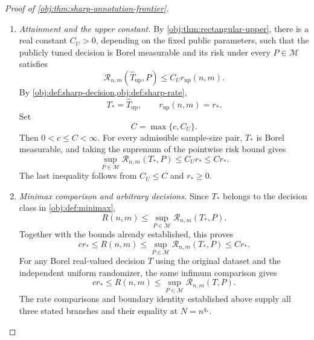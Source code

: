 \begin{proof}[Proof of \cref{obj:thm:sharp-annotation-frontier}]
\begin{enumerate}
\item \emph{Attainment and the upper constant.}
By \cref{obj:thm:rectangular-upper}, there is a real constant \(C_U>0\), depending on the fixed public parameters, such that the publicly tuned decision is Borel measurable and its risk under every \(P\in\mathcal M\) satisfies
\[
\mathcal R_{n,m}(\widehat T_{\mathrm{up}},P)
\le C_U r_{\mathrm{up}}(n,m).
\]
By \cref{obj:def:sharp-decision,obj:def:sharp-rate},
\[
T_*=\widehat T_{\mathrm{up}},
\qquad
r_{\mathrm{up}}(n,m)=r_*.
\]
Set
\[
C=\max\{c,C_U\}.
\]
Then \(0<c\le C<\infty\). For every admissible sample-size pair, \(T_*\) is Borel measurable, and taking the supremum of the pointwise risk bound gives
\[
\sup_{P\in\mathcal M}\mathcal R_{n,m}(T_*,P)
\le C_U r_*
\le C r_*.
\]
The last inequality follows from \(C_U\le C\) and \(r_*\ge0\).

\item \emph{Minimax comparison and arbitrary decisions.}
Since \(T_*\) belongs to the decision class in \cref{obj:def:minimax},
\[
R(n,m)\le
\sup_{P\in\mathcal M}\mathcal R_{n,m}(T_*,P).
\]
Together with the bounds already established, this proves
\[
c r_*
\le R(n,m)
\le\sup_{P\in\mathcal M}\mathcal R_{n,m}(T_*,P)
\le C r_*.
\]
For any Borel real-valued decision \(T\) using the original dataset and the independent uniform randomizer, the same infimum comparison gives
\[
c r_*\le R(n,m)
\le\sup_{P\in\mathcal M}\mathcal R_{n,m}(T,P).
\]
The rate comparisons and boundary identity established above supply all three stated branches and their equality at \(N=n^{q_*}\).
\end{enumerate}
\end{proof}

